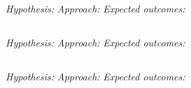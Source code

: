 \documentclass[../main.tex]{subfiles}
\begin{document}

\lipsum

\subsection*{\AimOneText}
\textit{Hypothesis:} 
\textit{Approach:} 
\textit{Expected outcomes:} 

\subsection*{\AimTwoText}
\textit{Hypothesis:} 
\textit{Approach:}
\textit{Expected outcomes:}

\subsection*{\AimThreeText}
\textit{Hypothesis:}
\textit{Approach:}
\textit{Expected outcomes:}
\end{document}
